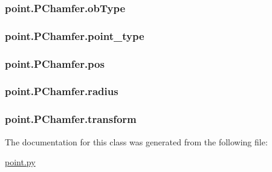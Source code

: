 \subsubsection[{ob\+Type}]{\setlength{\rightskip}{0pt plus 5cm}point.\+P\+Chamfer.\+ob\+Type}\label{classpoint_1_1_p_chamfer_aa9b5fa1686916ffc7c13e5db3fb47474}
\hypertarget{classpoint_1_1_p_chamfer_a1989aa77e716d9709f32e8f563aef107}{}
\subsubsection[{point\+\_\+type}]{\setlength{\rightskip}{0pt plus 5cm}point.\+P\+Chamfer.\+point\+\_\+type}\label{classpoint_1_1_p_chamfer_a1989aa77e716d9709f32e8f563aef107}
\hypertarget{classpoint_1_1_p_chamfer_a0f21901746d56629b131bcf0ef83eafc}{}
\subsubsection[{pos}]{\setlength{\rightskip}{0pt plus 5cm}point.\+P\+Chamfer.\+pos}\label{classpoint_1_1_p_chamfer_a0f21901746d56629b131bcf0ef83eafc}
\hypertarget{classpoint_1_1_p_chamfer_ad4727d834ae92c5056267560f9a10819}{}
\subsubsection[{radius}]{\setlength{\rightskip}{0pt plus 5cm}point.\+P\+Chamfer.\+radius}\label{classpoint_1_1_p_chamfer_ad4727d834ae92c5056267560f9a10819}
\hypertarget{classpoint_1_1_p_chamfer_a7b0062591fb3f786a5a95cd9296645d1}{}
\subsubsection[{transform}]{\setlength{\rightskip}{0pt plus 5cm}point.\+P\+Chamfer.\+transform}\label{classpoint_1_1_p_chamfer_a7b0062591fb3f786a5a95cd9296645d1}


The documentation for this class was generated from the following file\+:\begin{DoxyCompactItemize}
\item 
\hyperlink{point_8py}{point.\+py}\end{DoxyCompactItemize}
